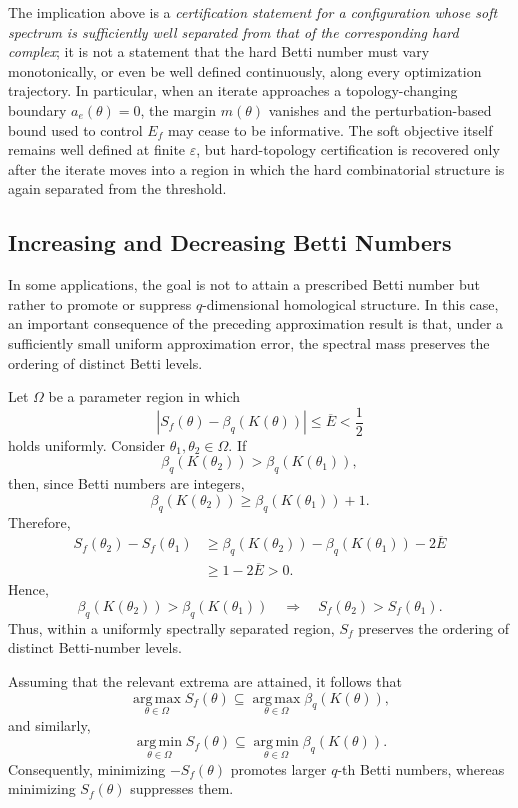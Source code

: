 \documentclass[pdflatex,sn-mathphys-num]{sn-jnl}%
\theoremstyle{thmstyleone}%
\theoremstyle{thmstyletwo}%
\theoremstyle{thmstylethree}%
\begin{document}
The implication above is a \emph{certification statement for a
configuration whose soft spectrum is sufficiently well separated from
that of the corresponding hard complex}; it is not a statement that the
hard Betti number must vary monotonically, or even be well defined
continuously, along every optimization trajectory. In particular, when
an iterate approaches a topology-changing boundary
$a_e(\theta)=0$, the margin $m(\theta)$ vanishes and the
perturbation-based bound used to control $E_f$ may cease to be
informative. The soft objective itself remains well defined at finite
$\varepsilon$, but hard-topology certification is recovered only after
the iterate moves into a region in which the hard combinatorial
structure is again separated from the threshold.



\subsection{Increasing and Decreasing Betti Numbers}

In some applications, the goal is not to attain a prescribed Betti number but rather to promote or suppress \(q\)-dimensional homological structure.
In this case, an important consequence of the preceding approximation result is that, under a sufficiently small uniform approximation error, the spectral mass preserves the ordering of distinct Betti levels.

Let \(\Omega\) be a parameter region in which
\[
\left|
S_f(\theta)
-
\beta_q(K(\theta))
\right|
\le
\overline E
<
\frac12
\]
holds uniformly.
Consider $\theta_1,\theta_2\in\Omega$.
If
\[
\beta_q(K(\theta_2))
>
\beta_q(K(\theta_1)),
\]
then, since Betti numbers are integers,
\[
\beta_q(K(\theta_2))
\ge
\beta_q(K(\theta_1))+1.
\]
Therefore,
\[
\begin{aligned}
S_f(\theta_2)-S_f(\theta_1)
&\ge
\beta_q(K(\theta_2))
-
\beta_q(K(\theta_1))
-
2\overline E
\\
&\ge
1-2\overline E
>
0.
\end{aligned}
\]
Hence,
\[
\beta_q(K(\theta_2))
>
\beta_q(K(\theta_1))
\quad\Longrightarrow\quad
S_f(\theta_2)
>
S_f(\theta_1).
\]
Thus, within a uniformly spectrally separated region, \(S_f\) preserves the ordering of distinct Betti-number levels.

Assuming that the relevant extrema are attained, it follows that
\[
\operatorname*{arg\,max}_{\theta\in\Omega}
S_f(\theta)
\subseteq
\operatorname*{arg\,max}_{\theta\in\Omega}
\beta_q(K(\theta)),
\]
and similarly,
\[
\operatorname*{arg\,min}_{\theta\in\Omega}
S_f(\theta)
\subseteq
\operatorname*{arg\,min}_{\theta\in\Omega}
\beta_q(K(\theta)).
\]
Consequently, minimizing $-S_f(\theta)$
promotes larger \(q\)-th Betti numbers, whereas minimizing $S_f(\theta)$
suppresses them.
\end{document}
